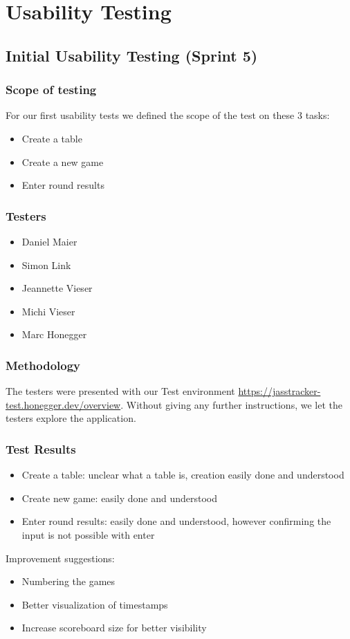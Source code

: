 \chapter{Usability Testing}\label{ch:uxtesting}

\section{Initial Usability Testing (Sprint 5)}

\subsection{Scope of testing}
For our first usability tests we defined the scope of the test on these 3 tasks:
\begin{itemize}
    \item Create a table
    \item Create a new game
    \item Enter round results
\end{itemize}

\subsection{Testers}
\begin{itemize}
    \item Daniel Maier
    \item Simon Link 
    \item Jeannette Vieser
    \item Michi Vieser
    \item Marc Honegger
\end{itemize}

\subsection{Methodology}
The testers were presented with our Test environment \url{https://jasstracker-test.honegger.dev/overview}.
Without giving any further instructions, we let the testers explore the application. 

\subsection{Test Results}
\begin{itemize}
    \item Create a table: unclear what a table is, creation easily done and understood
    \item Create new game: easily done and understood
    \item Enter round results: easily done and understood, however confirming the input is not possible with enter
\end{itemize}
Improvement suggestions: 
\begin{itemize}
    \item Numbering the games 
    \item Better visualization of timestamps
    \item Increase scoreboard size for better visibility
\end{itemize}


